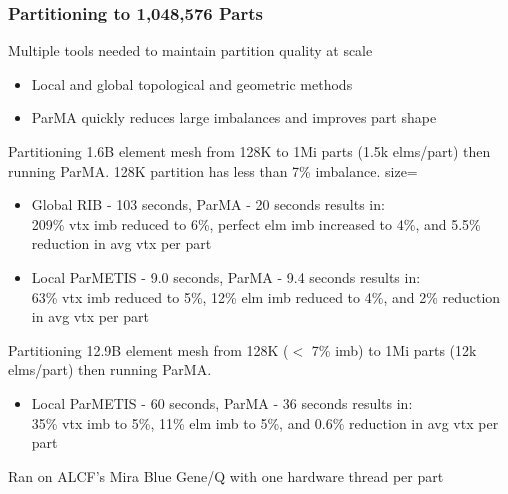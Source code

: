\documentclass{beamer}
\begin{document}
\begin{frame}
  \frametitle{Partitioning to 1,048,576 Parts}
  Multiple tools needed to maintain partition quality at scale
  \begin{itemize}
    \item Local and global topological and geometric methods
    \item ParMA quickly reduces large imbalances and improves part shape
  \end{itemize}
  Partitioning 1.6B element mesh from 128K to 1Mi parts (1.5k elms/part)
  then running ParMA.  128K partition has less than 7\% imbalance.
   {size=\small}
  \begin{itemize}
    \item Global RIB - 103 seconds, ParMA - 20 seconds results in:\\
      209\% vtx imb reduced to 6\%, perfect elm imb increased to 4\%, and
      5.5\% reduction in avg vtx per part
    \item Local ParMETIS - 9.0 seconds, ParMA - 9.4 seconds results in:\\
      63\% vtx imb reduced to 5\%, 12\% elm imb reduced to 4\%, and
      2\% reduction in avg vtx per part
  \end{itemize}
  Partitioning 12.9B element mesh from 128K ($<$ 7\% imb) to 1Mi parts (12k
  elms/part) then running ParMA.
  \begin{itemize}
    \item Local ParMETIS - 60 seconds, ParMA - 36 seconds results in:\\
      35\% vtx imb to 5\%, 11\% elm imb to 5\%, and
      0.6\% reduction in avg vtx per part
  \end{itemize}
  \small
  Ran on ALCF's Mira Blue Gene/Q with one hardware thread per part\\
\end{frame}
\end{document}
